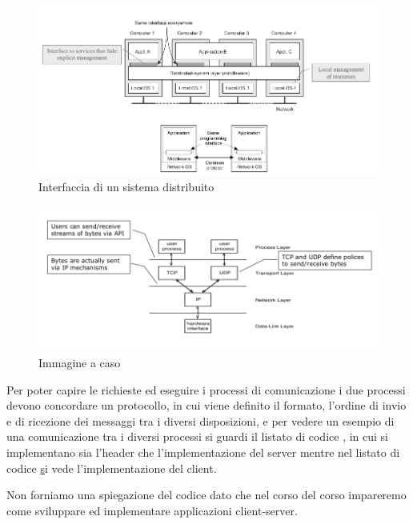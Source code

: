\message{ !name(sd.tex)}\documentclass[a4paper,12pt, oneside]{book}
\begin{document}
\begin{figure}
    \caption{Interfaccia di un sistema distribuito}
    \label{figura:interfaccia}
    \includegraphics[scale=2]{img/cli4.png}
\end{figure}

\begin{figure}
    \caption{Immagine a caso}
	\includegraphics[scale=2]{img/cli5.png}
\end{figure}
Per poter capire le richieste ed eseguire i processi di comunicazione i due processi devono concordare 
un protocollo, in cui viene definito il formato, l'ordine di invio e di ricezione dei messaggi tra 
i diversi disposizioni, e per vedere un esempio di una comunicazione tra i diversi processi si guardi
il listato di codice \href{listato:fileServer}, in cui si implementano sia l'header che l'implementazione
del server mentre nel listato di codice \href{listato:fileClient} si vede l'implementazione del client.

Non forniamo una spiegazione del codice dato che nel corso del corso impareremo come sviluppare ed
implementare applicazioni client-server.

\begin{figure}
    \label{listato:fileServer}
    \inputminted{c}{code/header.h}
    \inputminted{c}{code/fileServer.c}
\end{figure}
\end{document}

